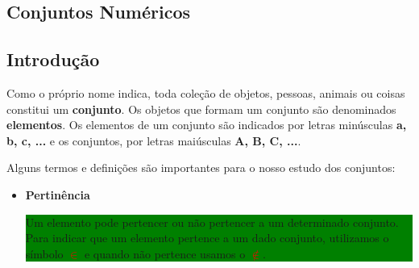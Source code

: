 \documentclass[11pt, openright, a4paper, brazil, english, french, spanish, bibjustif, openany, oneside]{abntex2}
\begin{document}
\begin{SingleSpace}

\frenchspacing 




\chapter*{Conjuntos Numéricos}

\section*{Introdução}

Como o próprio nome indica, toda coleção de objetos, pessoas, animais ou coisas constitui um \textbf{conjunto}. Os objetos que formam um conjunto são denominados \textbf{elementos}. Os elementos de um conjunto são indicados por letras minúsculas \textbf{a, b, c, ...} e os conjuntos, por letras maiúsculas \textbf{A, B, C, ...}.

Alguns termos e definições são importantes para o nosso estudo dos conjuntos:

\begin{itemize}

\item \textbf{Pertinência}

\colorbox{green}
{
\begin{minipage}{14.7cm}

Um elemento pode pertencer ou não pertencer a um determinado conjunto. Para indicar que um elemento pertence a um dado conjunto, utilizamos o símbolo \textcolor{red}{$\in$} e quando não pertence usamos o \textcolor{red}{$\not\in$}.


\end{minipage}}
\end{itemize}
\end{SingleSpace}
\end{document}
